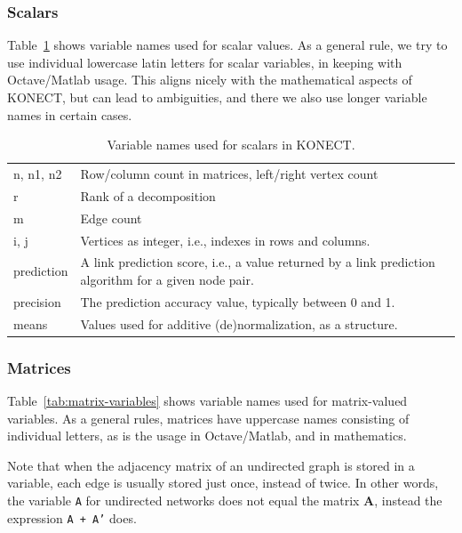 \documentclass{article}
\begin{document}
\subsubsection{Scalars}
Table~\ref{tab:scalar-variables} shows variable names used for scalar
values.  
As a general rule, we try to use individual lowercase latin letters for
scalar variables, in keeping with Octave/Matlab usage.  This aligns
nicely with the mathematical aspects of KONECT, but can lead to
ambiguities, and there we also use longer variable names in certain
cases. 

\begin{table}
  \caption{ Variable names used for scalars in KONECT.
    \label{tab:scalar-variables}
  } \centering
  \begin{tabular}{>{\ttfamily}lp{}}
    \toprule n, n1, n2 & Row/column count in matrices, left/right vertex
    count \\ r & Rank of a decomposition \\ m & Edge count \\ i, j &
    Vertices as integer, i.e., indexes in rows and
    columns. \\ prediction & A link prediction score, i.e., a value
    returned by a link prediction algorithm for a given node
    pair. \\ precision & The prediction accuracy value, typically
    between 0 and 1.  \\ means & Values used for additive
    (de)normalization, as a structure. \\ \bottomrule
  \end{tabular}
\end{table}

\subsubsection{Matrices}
Table~\ref{tab:matrix-variables} shows variable names used for
matrix-valued variables. 
As a general rules, matrices have uppercase names consisting of
individual letters, as is the usage in Octave/Matlab, and in
mathematics. 

Note that when the adjacency matrix of an undirected graph is stored in
a variable, each edge is usually stored just once, instead of twice. In
other words, the variable \texttt{A} for undirected networks does not
equal the matrix $\mathbf A$, instead the expression \texttt{A + A'}
does.
\end{document}
